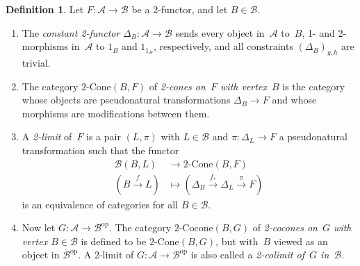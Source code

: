 \documentclass[12pt]{scrartcl}
\newcommand{\B}{\mathcal{B}}
\def\lra{\longrightarrow}
\def\lmt{\longmapsto}
\theoremstyle{definition}
\newtheorem{definition}{Definition}
\numberwithin{equation}{section}
\numberwithin{definition}{section}
\numberwithin{figure}{section}
\begin{document}
\begin{definition}
\label{def:2limit}
Let $F \colon \mathcal A \to \B$ be a 2-functor, and let $B\in\B$. 
\begin{enumerate}
\item
The \textsl{constant 2-functor} $\Delta_B \colon \mathcal A \to \B$ sends every object in~$\mathcal A$ to~$B$, 1- and 2-morphisms in~$\mathcal A$ to $1_B$ and $1_{1_B}$, respectively, and all constraints $(\Delta_B)_{g,h}$ are trivial. 
\item 
The category $2\text{-Cone}(B,F)$ of \textsl{2-cones on~$F$ with vertex~$B$} is the category whose objects are pseudonatural transformations $\Delta_B \to F$ and whose morphisms are modifications between them. 
\item 
A \textsl{2-limit} of~$F$ is a pair $(L,\pi)$ with $L\in \B$ and $\pi \colon \Delta_L \to F$ a pseudonatural transformation such that the functor
\begin{align*}
\B(B,L) 
& \lra 2\text{-Cone}(B,F) 
\\
(B \stackrel{f}{\lra} L) 
& \lmt (\Delta_B \stackrel{f_*}{\lra} \Delta_L \stackrel{\pi}{\lra} F) 
\end{align*}
is an equivalence of categories for all $B\in\B$. 
\item 
Now let $G \colon \mathcal A \to \B^{\text{op}}$. 
The category $2\text{-Cocone}(B,G)$ of \textsl{2-cocones on~$G$ with vertex $B \in \B$} is defined to be $2\text{-Cone}(B,G)$, but with~$B$ viewed as an object in $\B^{\text{op}}$. 
A 2-limit of $G \colon \mathcal A \to \B^{\text{op}}$ is also called a \textsl{2-colimit of~$G$ in~$\B$}. 
\end{enumerate}
\end{definition}
\end{document}
